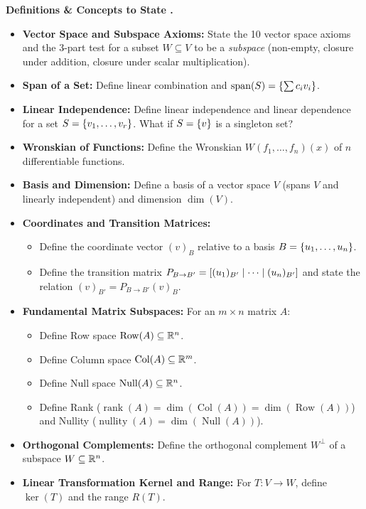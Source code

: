 \documentclass{natsirt}
\newcounter{topic}[section]
\newenvironment{recallbox}[1][]{%
    \begin{bluebox}[#1]\refstepcounter{topic}\textbf{Definitions \& Concepts to State \thesection.\thetopic}%
}{\end{bluebox}}
\newcommand{\citem}{\item[$\square$]}
\newcommand{\Null}{\operatorname{Null}}
\newcommand{\Row}{\operatorname{Row}}
\newcommand{\Col}{\operatorname{Col}}
\newcommand{\rank}{\operatorname{rank}}
\newcommand{\nullity}{\operatorname{nullity}}
\newcommand{\Span}{\operatorname{span}}
\begin{document}
\begin{recallbox}
    \begin{itemize}
        \citem \textbf{Vector Space and Subspace Axioms:} State the 10 vector space axioms and the 3-part test for a subset $W \subseteq V$ to be a \emph{subspace} (non-empty, closure under addition, closure under scalar multiplication).
        \citem \textbf{Span of a Set:} Define linear combination and $\Span(S) = \set{\sum c_i v_i}$.
        \citem \textbf{Linear Independence:} Define linear independence and linear dependence for a set $S = \left\{ v_1, \dots, v_r \right\}$. What if $S = \left\{ v \right\}$ is a singleton set?
        \citem \textbf{Wronskian of Functions:} Define the Wronskian $W(f_1, \dots, f_n)(x)$ of $n$ differentiable functions.
        \citem \textbf{Basis and Dimension:} Define a basis of a vector space $V$ (spans $V$ and linearly independent) and dimension $\dim(V)$.
        \citem \textbf{Coordinates and Transition Matrices:}
        \begin{itemize}
            \item Define the coordinate vector $(v)_B$ relative to a basis $B = \left\{ u_1, \dots, u_n \right\}$.
            \item Define the transition matrix $P_{B \to B'} = \left[(u_1)_{B'} \mid \dots \mid (u_n)_{B'}\right]$ and state the relation $(v)_{B'} = P_{B \to B'} (v)_B$.
        \end{itemize}
        \citem \textbf{Fundamental Matrix Subspaces:} For an $m \times n$ matrix $A$:
        \begin{itemize}
            \item Define Row space $\Row(A) \subseteq \R^n$.
            \item Define Column space $\Col(A) \subseteq \R^m$.
            \item Define Null space $\Null(A) \subseteq \R^n$.
            \item Define Rank ($\rank(A) = \dim(\Col(A)) = \dim(\Row(A))$) and Nullity ($\nullity(A) = \dim(\Null(A))$).
        \end{itemize}
        \citem \textbf{Orthogonal Complements:} Define the orthogonal complement $W^\perp$ of a subspace $W \subseteq \mathbb{R}^n$.
        \citem \textbf{Linear Transformation Kernel and Range:} For $T: V \to W$, define $\ker(T)$ and the range $R(T)$.
    \end{itemize}
\end{recallbox}
\end{document}
